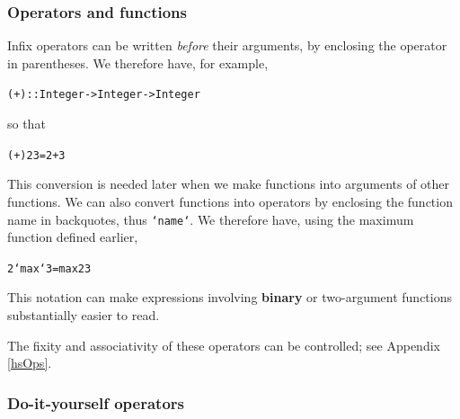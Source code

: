 \begin{figure}[t]
\end{figure}

\subsubsection*{Operators and functions}

Infix operators can be  written {\em before\/}
their arguments, by enclosing the operator in parentheses. We therefore have,
for example,
\begin{alltt}
(+) :: Integer -> Integer -> Integer
\end{alltt}
so that
\begin{alltt}
(+) 2 3 = 2 + 3
\end{alltt}
This conversion is needed later when we make functions into
arguments of other functions.
We can also convert functions into operators by enclosing the function name in
backquotes, thus \texttt{`name`}. We therefore have, using the maximum function
defined earlier,

\begin{alltt}
2 `max` 3 = max 2 3
\end{alltt}
This notation can make expressions involving \textbf{binary} or two-argument functions substantially easier to read.

The fixity and associativity of these operators can be controlled; see
Appendix \ref{hsOps}.

\subsubsection*{Do-it-yourself operators}

